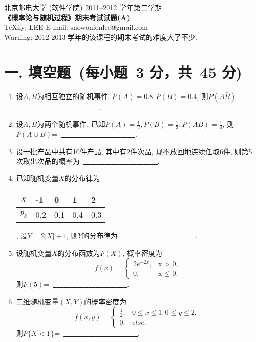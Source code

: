 \documentclass[a4paper,11pt]{article}
\newcommand{\blank}{\uline{\textcolor{white}{a}\ \textcolor{white}{a}\ \textcolor{white}{a}\ \textcolor{white}{a}\ \textcolor{white}{a}\ \textcolor{white}{a}\ \textcolor{white}{a}\ \textcolor{white}{a}\ \textcolor{white}{a}\ \textcolor{white}{a}\ \textcolor{white}{a}}}
\begin{document}
\begin{CJK}{UTF8}{song}


\begin{center}
北京邮电大学 (软件学院) 2011--2012 学年第二学期\\
{\Large
\textbf{《概率论与随机过程》期末考试试题(A)}
}
\\
TeXify: LEE E-mail: snowonionlee@gmail.com
\\
Warning: 2012-2013 学年的该课程的期末考试的难度大了不少.
\end{center}

\section*{一. 填空题~(每小题~3 分，共~45 分)}
\begin{enumerate}
\item 设$A,B$为相互独立的随机事件, $P(A)=0.8, P(B)=0.4$, 则$P(A\bar{B})$=~\blank.

\item 设$A,B$为两个随机事件, 已知$\displaystyle{ P(A)=\frac{1}{2}, P(B)=\frac{1}{3}, P(AB)=\frac{1}{4} }$, 则$P(A\cup B)$=~\blank.

\item 设一批产品中共有10件产品, 其中有2件次品, 现不放回地连续任取6件, 则第5次取出次品的概率为~\blank.

\item 已知随机变量$X$的分布律为
\begin{tabular}{l|llll}
$X$ & -1 & 0 & 1 & 2 \\
\hline
$p_k$ & 0.2 & 0.1 & 0.4 & 0.3
\end{tabular},
设$Y=2\vert X\vert +1$, 则$Y$的分布律为~\blank.



\item 设随机变量$X$的分布函数为$F(X)$, 概率密度为
\[
f(x)=
\left\{
\begin{array}{ll}
2e^{-2x},&\textrm{x $>$ 0,} \\
0,&\textrm{x $\le$ 0.}
\end{array}
\right.
\]
则$F(5)$=~\blank.

\item 二维随机变量$(X,Y)$的概率密度为
\begin{displaymath}
f(x,y)=
\left\{
\begin{array}{ll}
\displaystyle{ \frac{1}{2} }, & \textrm{$0 \le x \le 1, 0 \le y \le 2,$} \\
0, & \textrm{$else$.}
\end{array}
\right.
\end{displaymath}
则$P\{X<Y\}$=~\blank.


\end{enumerate}
\end{CJK}
\end{document}
